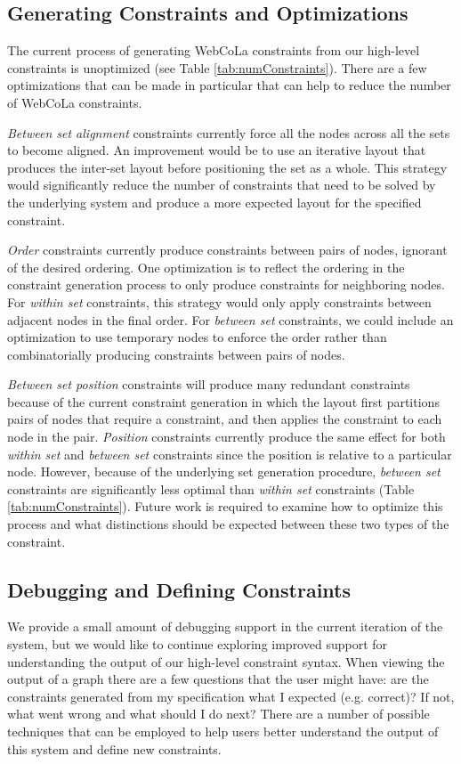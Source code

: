 \subsection{Generating Constraints and Optimizations}
The current process of generating WebCoLa constraints from our high-level constraints is unoptimized (see Table \ref{tab:numConstraints}). There are a few optimizations that can be made in particular that can help to reduce the number of WebCoLa constraints.

\emph{Between set alignment} constraints currently force all the nodes across all the sets to become aligned. An improvement would be to use an iterative layout that produces the inter-set layout before positioning the set as a whole. This strategy would significantly reduce the number of constraints that need to be solved by the underlying system and produce a more expected layout for the specified constraint.

\emph{Order} constraints currently produce constraints between pairs of nodes, ignorant of the desired ordering. One optimization is to reflect the ordering in the constraint generation process to only produce constraints for neighboring nodes. For \emph{within set} constraints, this strategy would only apply constraints between adjacent nodes in the final order. For \emph{between set} constraints, we could include an optimization to use temporary nodes to enforce the order rather than combinatorially producing constraints between pairs of nodes.

\emph{Between set position} constraints will produce many redundant constraints because of the current constraint generation in which the layout first partitions pairs of nodes that require a constraint, and then applies the constraint to each node in the pair. \emph{Position} constraints currently produce the same effect for both \emph{within set} and \emph{between set} constraints since the position is relative to a particular node. However, because of the underlying set generation procedure, \emph{between set} constraints are significantly less optimal than \emph{within set} constraints (Table \ref{tab:numConstraints}). Future work is required to examine how to optimize this process and what distinctions should be expected between these two types of the constraint.

\subsection{Debugging and Defining Constraints}
We provide a small amount of debugging support in the current iteration of the system, but we would like to continue exploring improved support for understanding the output of our high-level constraint syntax. When viewing the output of a graph there are a few questions that the user might have: are the constraints generated from my specification what I expected (e.g. correct)? If not, what went wrong and what should I do next? There are a number of possible techniques that can be employed to help users better understand the output of this system and define new constraints.

